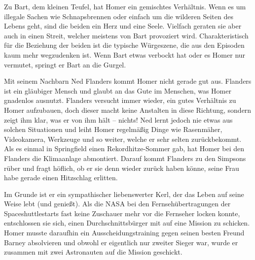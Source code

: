 Zu Bart, dem kleinen Teufel, hat Homer ein gemischtes Verhältnis. Wenn es um illegale Sachen wie Schnapsbrennen oder einfach um die wilderen Seiten des Lebens geht, sind die beiden ein Herz und eine Seele. Vielfach geraten sie aber auch in einen Streit, welcher meistens von Bart provoziert wird. Charakteristisch für die Beziehung der beiden ist die typische Würgeszene, die aus den Episoden kaum mehr wegzudenken ist. Wenn Bart etwas verbockt hat oder es Homer nur vermutet, springt er Bart an die Gurgel.

Mit seinem Nachbarn Ned Flanders kommt Homer nicht gerade gut aus. Flanders ist ein gläu\-bi\-ger Mensch und glaubt an das Gute im Menschen, was Homer gnadenlos ausnutzt. Flanders versucht immer wieder, ein gutes Verhältnis zu Homer aufzubauen, doch dieser macht keine Anstalten in diese Richtung, sondern zeigt ihm klar, was er von ihm hält -- nichts! Ned lernt jedoch nie etwas aus solchen Situationen und leiht Homer regelmäßig Dinge wie Rasenmäher, Videokamera, Werkzeuge und so weiter, welche er sehr selten zurückbekommt. Als es einmal in Springfield einen Rekordhitze-Sommer gab, hat Homer bei den Flanders die Klimaanlage abmontiert. Darauf kommt Flanders zu den Simpsons rüber und fragt höflich, ob er sie denn wieder zurück haben könne, seine Frau habe gerade einen Hitzschlag erlitten.

Im Grunde ist er ein sympathischer liebenswerter Kerl, der das Leben auf seine Weise lebt (und genießt). Als die NASA bei den Fernsehübertragungen der Spaceshuttlestarts fast keine Zuschauer mehr vor die Fernseher locken konnte, entschlossen sie sich, einen Durchschnittsbürger mit auf eine Mission zu schicken. Homer musste daraufhin ein Ausscheidungstraining gegen seinen besten Freund Barney absolvieren und obwohl er eigentlich nur zweiter Sieger war, wurde er zusammen mit zwei Astronauten auf die Mission geschickt.

